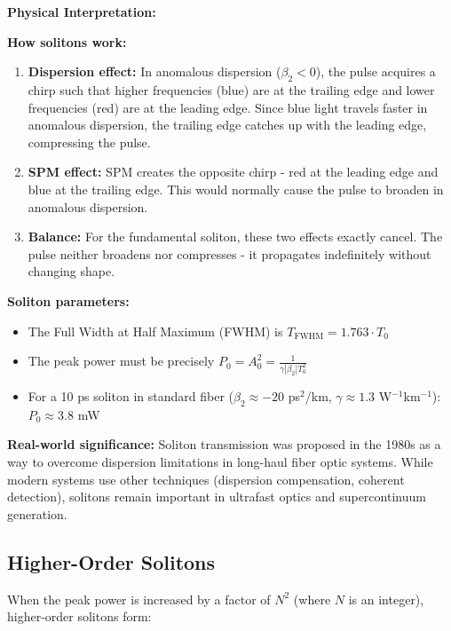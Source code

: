 \documentclass[a4paper, 11pt]{article}
\begin{document}
\begin{physical}
\textbf{Physical Interpretation:}

\textbf{How solitons work:}
\begin{enumerate}
    \item \textbf{Dispersion effect:} In anomalous dispersion ($\beta_2 < 0$), the pulse acquires a chirp such that higher frequencies (blue) are at the trailing edge and lower frequencies (red) are at the leading edge. Since blue light travels faster in anomalous dispersion, the trailing edge catches up with the leading edge, compressing the pulse.
    
    \item \textbf{SPM effect:} SPM creates the opposite chirp - red at the leading edge and blue at the trailing edge. This would normally cause the pulse to broaden in anomalous dispersion.
    
    \item \textbf{Balance:} For the fundamental soliton, these two effects exactly cancel. The pulse neither broadens nor compresses - it propagates indefinitely without changing shape.
\end{enumerate}

\textbf{Soliton parameters:}
\begin{itemize}
    \item The Full Width at Half Maximum (FWHM) is $T_{\text{FWHM}} = 1.763 \cdot T_0$
    \item The peak power must be precisely $P_0 = A_0^2 = \frac{1}{\gamma |\beta_2| T_0^2}$
    \item For a 10 ps soliton in standard fiber ($\beta_2 \approx -20$ ps$^2$/km, $\gamma \approx 1.3$ W$^{-1}$km$^{-1}$): $P_0 \approx 3.8$ mW
\end{itemize}

\textbf{Real-world significance:} Soliton transmission was proposed in the 1980s as a way to overcome dispersion limitations in long-haul fiber optic systems. While modern systems use other techniques (dispersion compensation, coherent detection), solitons remain important in ultrafast optics and supercontinuum generation.
\end{physical}

\subsection{Higher-Order Solitons}

When the peak power is increased by a factor of $N^2$ (where $N$ is an integer), higher-order solitons form:
\end{document}
